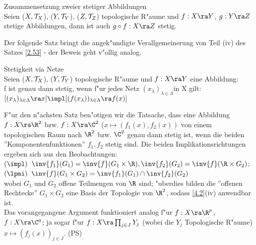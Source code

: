 \begin{satz}\label{4.3}{\sc Zusammensetzung zweier stetiger Abbildungen}\\
Seien ($X,\mathcal T_X$), ($Y,\mathcal T_Y$), ($Z,\mathcal T_Z$) topologische R"aume und $f:X\ra Y$, $g:Y\ra Z$ stetige Abbildungen, dann ist auch $g\circ f:X\ra Z$ stetig.
\end{satz}
Der folgende Satz bringt die angek"undigte Verallgemeinerung von Teil (iv) des Satzes \ref{2.53} - der Beweis geht v"ollig analog.
\begin{satz}\label{4.4}{\sc Stetigkeit via Netze}\\
Seien ($X,\mathcal T_X$), ($Y,\mathcal T_Y$) topologische R"aume und $f:X\ra Y$ eine Abbildung:\\
f ist genau dann stetig, wenn f"ur jedes Netz $(x_\lambda )_{\lambda\in\Lambda}$in X gilt:\\
$[(x_\lambda )_{\lambda\in\Lambda}\ra x]\impl [(f(x_\lambda ))_{\lambda\in\Lambda}\ra f(x)]$
\end{satz}

F"ur den n"achsten Satz ben"otigen wir die Tatsache, dass eine Abbildung $f:X\ra\R^2$ bzw. $f:X\ra\C^2$ ($x\mapsto (f_1(x),f_2(x))$ von einem topologischen Raum nach $\R^2$ bzw. $\C^2$ genau dann stetig ist, wenn die beiden ''Komponentenfunktionen'' $f_1, f_2$ stetig sind. Die beiden Implikationsrichtungen ergeben sich aus den Beobachtungen:\\
\indent$(\impl )$ $\inv{f_1}(G_1) = \inv{f}(G_1\times\R ), \inv{f_2}(G_2) = \inv{f}(\R\times G_2 )$;\\
\indent$(\lpmi )$ $\inv{f}(G_1\times G_2)=\inv{f_1}(G_1)\cap\inv{f_2}(G_2)$\\
wobei $G_1$ und $G_2$ offene Teilmengen von $\R$ sind; "uberdies bilden die ''offenen Rechtecke'' $G_1\times G_2$ eine Basis der Topologie von $\R^2$, sodass \ref{4.2}(iv) anwendbar ist.\vspace*{0.3cm}\\
Das vorangegangene Argument funktioniert analog f"ur $f:X\ra\R^p$, $f:X\ra\C^q$; ja sogar f"ur $f:X\ra\prod_{j\in J}Y_j$ (wobei die $Y_j$ Topologische R"aume) $x\mapsto (f_j(x))_{j\in J}$. (PS)


